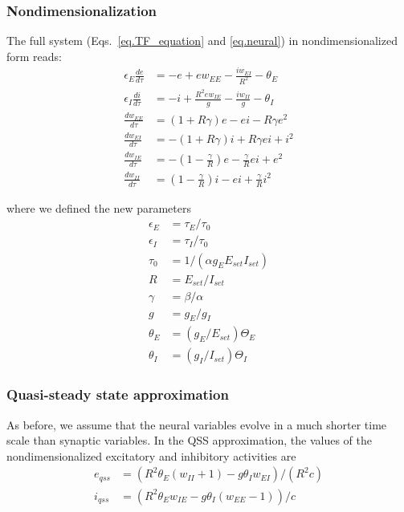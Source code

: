 \documentclass[
twocolumn,
]{article}
\newcommand{\EE}{\mathit{EE}}
\newcommand{\EI}{\mathit{EI}}
\newcommand{\IE}{\mathit{IE}}
\newcommand{\II}{\mathit{II}}
\newcommand{\set}{\mathit{set}}
\newcommand{\qss}{\mathit{qss}}
\begin{document}
\subsubsection{Nondimensionalization}

The full system (Eqs.\ \ref{eq.TF_equation} and \ref{eq.neural}) in nondimensionalized form reads:
\begin{equation}
\begin{aligned}
\epsilon_E \frac{de}{d\tau} & = -e + e w_{\EE} - \frac{i w_{\EI}}{R^2} - \theta_E \\
\epsilon_I \frac{di}{d\tau} & = -i + \frac{R^2 e w_{\IE}}{g} - \frac{i w_{\II}}{g} - \theta_I \\
\frac{dw_{\EE}}{d\tau} & = (1+R\gamma)e - ei - R\gamma e^2 \\
\frac{dw_{\EI}}{d\tau} & = -(1+R\gamma)i + R\gamma e i + i^2 \\
\frac{dw_{\IE}}{d\tau} & = -(1-\frac{\gamma}{R})e -\frac{\gamma}{R} ei + e^2\\
\frac{dw_{\II}}{d\tau} & = (1-\frac{\gamma}{R})i - ei + \frac{\gamma}{R} i^2
\end{aligned}
\label{eq.TF_full_norm}
\end{equation}

\noindent where we defined the new parameters
\begin{displaymath}
\begin{aligned}
\epsilon_E & = \tau_E/\tau_0 \\
\epsilon_I & = \tau_I/\tau_0 \\
\tau_0 & = 1/(\alpha g_E E_{\set} I_{\set}) \\
R & = E_{\set}/I_{\set} \\
\gamma & = \beta/\alpha \\
g & = g_E/g_I \\
\theta_E & = (g_E/E_{\set}) \Theta_E \\
\theta_I & = (g_I/I_{\set}) \Theta_I
\end{aligned}
\end{displaymath}



\subsubsection{Quasi-steady state approximation}

As before, we assume that the neural variables evolve in a much shorter time scale than synaptic variables. In the QSS approximation, the values of the nondimensionalized excitatory and inhibitory activities are
\begin{equation}
\begin{aligned}
e_{\qss} & = (R^2\theta_E(w_{\II} + 1) - g \theta_I w_{\EI})/(R^2 c) \\
i_{\qss} & = (R^2\theta_E w_{\IE} - g \theta_I (w_{\EE} - 1))/c
\end{aligned}
\label{eq.TF_upstate_qss}
\end{equation}
\end{document}
